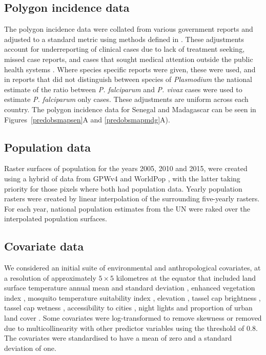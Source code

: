 \documentclass{statsoc}
\begin{document}
\subsection*{Polygon incidence data}


The polygon incidence data were collated from various government reports and adjusted to a standard metric using methods defined in \citep{cibulskis2011worldwide, weiss2019mapping}.
These adjustments account for underreporting of clinical cases due to lack of treatment seeking, missed case reports, and cases that sought medical attention outside the public health systems \citep{battle2016treatment}.
Where species specific reports were given, these were used, and in reports that did not distinguish between species of \emph{Plasmodium} the national estimate of the ratio between \emph{P. falciparum} and \emph{P. vivax} cases were used to estimate \emph{P. falciparum} only cases.
These adjustments are uniform across each country.
The polygon incidence data for Senegal and Madagascar can be seen in Figures~\ref{predobsmapsen}A and \ref{predobsmapmdg}A).


\subsection*{Population data}

Raster surfaces of population for the years 2005, 2010 and 2015, were created using a hybrid of data from GPWv4 \citep{gpw4} and WorldPop \citep{tatem2017worldpop}, with the latter taking priority for those pixels where both had population data. 
Yearly population rasters were created by linear interpolation of the surrounding five-yearly rasters.
For each year, national population estimates from the UN were raked over the interpolated population surfaces. 


\subsection*{Covariate data}

We considered an initial suite of environmental and anthropological covariates, at a resolution of approximately $5 \times 5$ kilometres at the equator that included land surface temperature annual mean and standard deviation \citep{LST}, enhanced vegetation index \citep{TCB}, mosquito temperature suitability index \citep{weiss2014air}, elevation \citep{SRTMElev}, tassel cap brightness \citep{TCB}, tassel cap wetness \citep{TCB}, accessibility to cities \citep{weiss2018global}, night lights \citep{elvidge2017viirs} and proportion of urban land cover \citep{GUF}. %
Some covariates were log-transformed to remove skewness or removed due to multicollinearity with other predictor variables using the threshold of 0.8. %
The covariates were standardised to have a mean of zero and a standard deviation of one.
\end{document}
